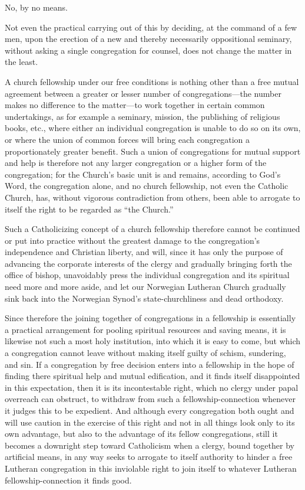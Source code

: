 No, by no means.

Not even the practical carrying out of this by deciding, at the command of a few men, upon the erection of a new and thereby necessarily oppositional seminary, without asking a single congregation for counsel, does not change the matter in the least.

A church fellowship under our free conditions is nothing other than a free mutual agreement between a greater or lesser number of congregations—the number makes no difference to the matter—to work together in certain common undertakings, as for example a seminary, mission, the publishing of religious books, etc., where either an individual congregation is unable to do so on its own, or where the union of common forces will bring each congregation a proportionately greater benefit. Such a union of congregations for mutual support and help is therefore not any larger congregation or a higher form of the congregation; for the Church’s basic unit is and remains, according to God’s Word, the congregation alone, and no church fellowship, not even the Catholic Church, has, without vigorous contradiction from others, been able to arrogate to itself the right to be regarded as “the Church.”

Such a Catholicizing concept of a church fellowship therefore cannot be continued or put into practice without the greatest damage to the congregation’s independence and Christian liberty, and will, since it has only the purpose of advancing the corporate interests of the clergy and gradually bringing forth the office of bishop, unavoidably press the individual congregation and its spiritual need more and more aside, and let our Norwegian Lutheran Church gradually sink back into the Norwegian Synod’s state-churchliness and dead orthodoxy.

Since therefore the joining together of congregations in a fellowship is essentially a practical arrangement for pooling spiritual resources and saving means, it is likewise not such a most holy institution, into which it is easy to come, but which a congregation cannot leave without making itself guilty of schism, sundering, and sin. If a congregation by free decision enters into a fellowship in the hope of finding there spiritual help and mutual edification, and it finds itself disappointed in this expectation, then it is its incontestable right, which no clergy under papal overreach can obstruct, to withdraw from such a fellowship-connection whenever it judges this to be expedient. And although every congregation both ought and will use caution in the exercise of this right and not in all things look only to its own advantage, but also to the advantage of its fellow congregations, still it becomes a downright step toward Catholicism when a clergy, bound together by artificial means, in any way seeks to arrogate to itself authority to hinder a free Lutheran congregation in this inviolable right to join itself to whatever Lutheran fellowship-connection it finds good.

